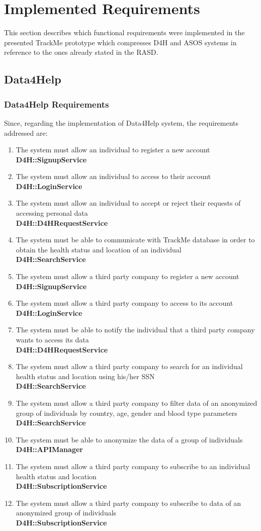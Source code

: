 \documentclass[a4paper, hidelinks, 12pt]{report}
\newcommand\requirement[1]{\item[{[R#1]}] }
\begin{document}
	\chapter{Implemented Requirements}	
This section describes which functional requirements were implemented in the presented TrackMe prototype which compresses D4H and ASOS systems in reference to the ones already stated in the RASD.

\section{\textbf{Data4Help}}
\subsection{Data4Help Requirements}
	Since, regarding the implementation of Data4Help system, the requirements addressed are:

	\begin{enumerate}
		\requirement{1} The system must allow an individual to register a new account \\
		\textbf{D4H::SignupService}
		\requirement{2} The system must allow an individual to access to their account \\
		\textbf{D4H::LoginService}
		\requirement{3} The system must allow an individual to accept or reject their requests of accessing personal data \\
		\textbf{D4H::D4HRequestService}
		\requirement{4} The system must be able to communicate with TrackMe database in order to obtain the health status and location of an individual \\
		\textbf{D4H::SearchService}
		\requirement{5} The system must allow a third party company to register a new account \\		
		\textbf{D4H::SignupService}
		\requirement{6} The system must allow a third party company to access to its account 	\\		
		\textbf{D4H::LoginService}
		\requirement{7} The system must be able to notify the individual that a third party company wants to access its data \\
		\textbf{D4H::D4HRequestService}
		\requirement{8} The system must allow a third party company to search for an individual health status and location using his/her SSN \\
		 \textbf{D4H::SearchService}
		 \requirement{9} The system must allow a third party company to filter data of an anonymized group of individuals by country, age, gender and blood type parameters \\ 
		 \textbf{D4H::SearchService}
		 \requirement{10} The system must be able to anonymize the data of a group of individuals \\
		 \textbf{D4H::APIManager}
		 \requirement{11} The system must allow a third party company to subscribe to an individual health status and location \\ 
		\textbf{D4H::SubscriptionService}
		\requirement{12} The system must allow a third party company to subscribe to data of an anonymized group of individuals \\
		\textbf{D4H::SubscriptionService}
	\end{enumerate}	
\end{document}
